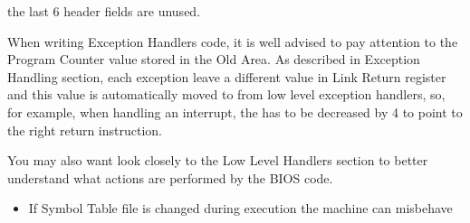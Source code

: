 the last 6 header fields are unused.


When writing Exception Handlers code, it is well advised to pay attention to the Program Counter value stored in the Old Area. As described in Exception Handling section, each exception leave a different value in Link Return register and this value is automatically moved to  from low level exception handlers, so, for example, when handling an interrupt, the  has to be decreased by 4 to point to the right return instruction.

You may also want look closely to the Low Level Handlers section to better understand what actions are performed by the BIOS code.


\begin{itemize}
\item If Symbol Table file is changed during execution the machine can misbehave
\end{itemize}
